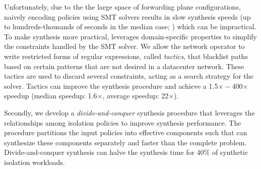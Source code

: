 
Unfortunately, due to the the large space of forwarding plane
configurations, naively encoding policies using SMT solvers results in
slow synthesis speeds (up to hundreds-thousands of seconds in the
median case; ) which can be impractical.
To make synthesis more practical, \Name leverages domain-specific
properties to simplify the constraints handled by the SMT solver.
We allow the network operator to write restricted
forms of regular expressions, called \emph{tactics}, that blacklist
paths based on certain patterns that are not desired in a datacenter
network.
These tactics are used to discard several constraints, 
acting as a search strategy for the solver.
Tactics can improve the synthesis procedure and achieve
a 1.5$\times - $400$\times$ speedup 
(median speedup: 1.6$\times$, average speedup: 22$\times$).

 Secondly, we develop a \emph{divide-and-conquer} synthesis procedure
 that leverages the relationships among  isolation policies to
 improve synthesis performance. The procedure partitions the input
 policies into effective components such that \name can synthesize
 these components separately and faster than the complete problem.
 Divide-and-conquer synthesis can halve the synthesis time for 40\% of
 synthetic isolation workloads.


